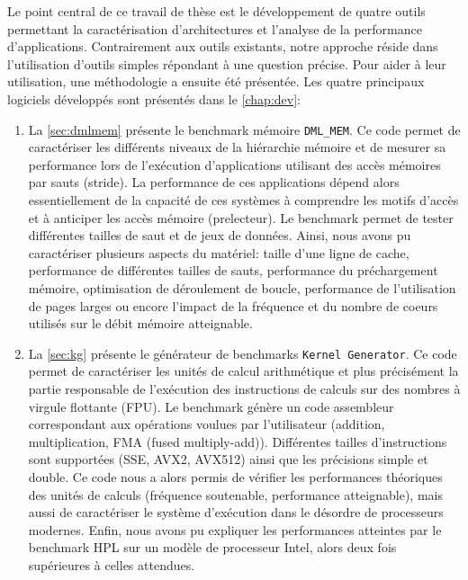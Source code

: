         Le point central de ce travail de thèse est le développement de quatre outils permettant la caractérisation d'architectures et l'analyse de la performance d'applications. Contrairement aux outils existants, notre approche réside dans l'utilisation d'outils simples répondant à une question précise. Pour aider à leur utilisation, une méthodologie a ensuite été présentée. Les quatre principaux logiciels développés sont présentés dans le \autoref{chap:dev}:
        \begin{enumerate}
            \item La \autoref{sec:dmlmem} présente le \gls{benchmark} mémoire \verb|DML_MEM|. Ce code permet de caractériser les différents niveaux de la hiérarchie mémoire et de mesurer sa performance lors de l'exécution d'applications utilisant des accès mémoires par sauts (\gls{stride}). La performance de ces applications dépend alors essentiellement de la capacité de ces systèmes à comprendre les motifs d'accès et à anticiper les accès mémoire (\gls{prelecteur}).
            Le benchmark permet de tester différentes tailles de saut et de jeux de données. Ainsi, nous avons pu caractériser plusieurs aspects du matériel: taille d'une ligne de cache, performance de différentes tailles de sauts, performance du préchargement mémoire, optimisation de déroulement de boucle, performance de l'utilisation de pages larges ou encore l'impact de la fréquence et du nombre de coeurs utilisés sur le débit mémoire atteignable.
            
            \item La \autoref{sec:kg} présente le générateur de benchmarks \verb|Kernel Generator|. Ce code permet de caractériser les unités de calcul arithmétique et plus précisément la partie responsable de l'exécution des instructions de calculs sur des nombres à virgule flottante (\gls{FPU}). Le benchmark génère un code assembleur correspondant aux opérations voulues par l'utilisateur (addition, multiplication, FMA (fused multiply-add)).  Différentes tailles d'instructions sont supportées (SSE, AVX2, AVX512) ainsi que les précisions simple et double. Ce code nous a alors permis de vérifier les performances théoriques des unités de calculs (fréquence soutenable, performance atteignable), mais aussi de caractériser le système d'exécution dans le désordre de processeurs modernes. Enfin, nous avons pu expliquer les performances atteintes par le benchmark HPL sur un modèle de processeur Intel, alors deux fois supérieures à celles attendues. 
            

\end{enumerate}
